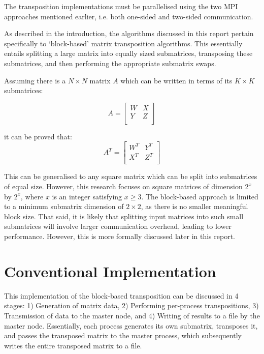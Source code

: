 \documentclass[journal,10pt,a4paper]{IEEEtran}
\begin{document}
The transposition implementations must be parallelised using the two MPI approaches mentioned earlier, i.e. both one-sided and two-sided communication.

As described in the introduction, the algorithms discussed in this report pertain specifically to `block-based' matrix transposition algorithms. This essentially entails splitting a large matrix into equally sized submatrices, transposing these submatrices, and then performing the appropriate submatrix swaps.

Assuming there is a $N\times N$ matrix $A$ which can be written in terms of its $K \times K$ submatrices:

\begin{equation}
A=
\begin{bmatrix}
    W       & X \\
   Y&Z \\
\end{bmatrix}
\end{equation}


it can be proved that:
\begin{equation}
    A^T=
\begin{bmatrix}
    W^T       & Y^T \\
   X^T&Z^T \\
\end{bmatrix}
\end{equation}



This can be generalised to any square matrix which can be split into submatrices of equal size. However, this research focuses on square matrices of dimension $2^x$ by $2^x$, where $x$ is an integer satisfying $x\geq 3$. The block-based approach is limited to a minimum submatrix dimension of $2\times 2$, as there is no smaller meaningful block size. That said, it is likely that splitting input matrices into such small submatrices will involve larger communication overhead, leading to lower performance. However, this is more formally discussed later in this report.




\section{Conventional Implementation}

This implementation of the block-based transposition can be discussed in 4 stages: 1) Generation of matrix data, 2) Performing per-process transpositions, 3) Transmission of data to the master node, and 4) Writing of results to a file by the master node. Essentially, each process generates its own submatrix, transposes it, and passes the transposed matrix to the master process, which subsequently writes the entire transposed matrix to a file.
\end{document}
